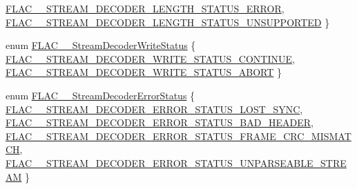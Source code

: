 \begin{DoxyCompactItemize}
\mbox{\hyperlink{group__flac__stream__decoder_ggad5860157c2bb34501b8b9370472d727aab000e31c0c20c0d19df4f2203b01ea23}{F\+L\+A\+C\+\_\+\+\_\+\+S\+T\+R\+E\+A\+M\+\_\+\+D\+E\+C\+O\+D\+E\+R\+\_\+\+L\+E\+N\+G\+T\+H\+\_\+\+S\+T\+A\+T\+U\+S\+\_\+\+E\+R\+R\+OR}}, 
\mbox{\hyperlink{group__flac__stream__decoder_ggad5860157c2bb34501b8b9370472d727aae35949f46f887e6d826fe0fe4b2a32c1}{F\+L\+A\+C\+\_\+\+\_\+\+S\+T\+R\+E\+A\+M\+\_\+\+D\+E\+C\+O\+D\+E\+R\+\_\+\+L\+E\+N\+G\+T\+H\+\_\+\+S\+T\+A\+T\+U\+S\+\_\+\+U\+N\+S\+U\+P\+P\+O\+R\+T\+ED}}
 \}
\item 
enum \mbox{\hyperlink{group__flac__stream__decoder_ga73f67eb9e0ab57945afe038751bc62c8}{F\+L\+A\+C\+\_\+\+\_\+\+Stream\+Decoder\+Write\+Status}} \{ \mbox{\hyperlink{group__flac__stream__decoder_gga73f67eb9e0ab57945afe038751bc62c8acea48326e0ab8370d2814f4126fcb84e}{F\+L\+A\+C\+\_\+\+\_\+\+S\+T\+R\+E\+A\+M\+\_\+\+D\+E\+C\+O\+D\+E\+R\+\_\+\+W\+R\+I\+T\+E\+\_\+\+S\+T\+A\+T\+U\+S\+\_\+\+C\+O\+N\+T\+I\+N\+UE}}, 
\mbox{\hyperlink{group__flac__stream__decoder_gga73f67eb9e0ab57945afe038751bc62c8a23bd6bfec34af704e0d5ea273f14d95d}{F\+L\+A\+C\+\_\+\+\_\+\+S\+T\+R\+E\+A\+M\+\_\+\+D\+E\+C\+O\+D\+E\+R\+\_\+\+W\+R\+I\+T\+E\+\_\+\+S\+T\+A\+T\+U\+S\+\_\+\+A\+B\+O\+RT}}
 \}
\item 
enum \mbox{\hyperlink{group__flac__stream__decoder_ga130e70bd9a73d3c2416247a3e5132ecf}{F\+L\+A\+C\+\_\+\+\_\+\+Stream\+Decoder\+Error\+Status}} \{ \mbox{\hyperlink{group__flac__stream__decoder_gga130e70bd9a73d3c2416247a3e5132ecfa3ceec2a553dc142ad487ae88eb6f7222}{F\+L\+A\+C\+\_\+\+\_\+\+S\+T\+R\+E\+A\+M\+\_\+\+D\+E\+C\+O\+D\+E\+R\+\_\+\+E\+R\+R\+O\+R\+\_\+\+S\+T\+A\+T\+U\+S\+\_\+\+L\+O\+S\+T\+\_\+\+S\+Y\+NC}}, 
\mbox{\hyperlink{group__flac__stream__decoder_gga130e70bd9a73d3c2416247a3e5132ecfae393a9b91a6b2f23398675b5b57e1e86}{F\+L\+A\+C\+\_\+\+\_\+\+S\+T\+R\+E\+A\+M\+\_\+\+D\+E\+C\+O\+D\+E\+R\+\_\+\+E\+R\+R\+O\+R\+\_\+\+S\+T\+A\+T\+U\+S\+\_\+\+B\+A\+D\+\_\+\+H\+E\+A\+D\+ER}}, 
\mbox{\hyperlink{group__flac__stream__decoder_gga130e70bd9a73d3c2416247a3e5132ecfa208fe77a04e6ff684e50f0eae1214e26}{F\+L\+A\+C\+\_\+\+\_\+\+S\+T\+R\+E\+A\+M\+\_\+\+D\+E\+C\+O\+D\+E\+R\+\_\+\+E\+R\+R\+O\+R\+\_\+\+S\+T\+A\+T\+U\+S\+\_\+\+F\+R\+A\+M\+E\+\_\+\+C\+R\+C\+\_\+\+M\+I\+S\+M\+A\+T\+CH}}, 
\mbox{\hyperlink{group__flac__stream__decoder_gga130e70bd9a73d3c2416247a3e5132ecfa8b6864ad65edd8fea039838b6d3e5575}{F\+L\+A\+C\+\_\+\+\_\+\+S\+T\+R\+E\+A\+M\+\_\+\+D\+E\+C\+O\+D\+E\+R\+\_\+\+E\+R\+R\+O\+R\+\_\+\+S\+T\+A\+T\+U\+S\+\_\+\+U\+N\+P\+A\+R\+S\+E\+A\+B\+L\+E\+\_\+\+S\+T\+R\+E\+AM}}
 \}
\end{DoxyCompactItemize}
